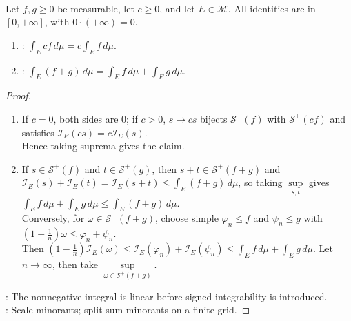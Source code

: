 \begin{proposition} \label{prop:nonnegative-integral-homogeneity-additivity} \\
Let $f,g\geq0$ be measurable, let $c\geq0$, and let $E\in\mathcal{M}$. All identities are in $[0,+\infty]$, with $0\cdot(+\infty)=0$.
\begin{enumerate}[label=(\roman*)]
\setlength{\itemsep}{0pt}
\item {}: $\int_E cf\,d\mu=c\int_E f\,d\mu$.
\item {}: $\int_E(f+g)\,d\mu=\int_Ef\,d\mu+\int_Eg\,d\mu$.
\end{enumerate}
\begin{proof}
\begin{enumerate}[label=(\roman*)]
\setlength{\itemsep}{0pt}
\item If $c=0$, both sides are $0$; if $c>0$, $s\mapsto cs$ bijects $\mathcal{S}^+(f)$ with $\mathcal{S}^+(cf)$ and satisfies $\mathcal{I}_E(cs)=c\mathcal{I}_E(s)$.\\
Hence taking suprema gives the claim.
\item If $s\in\mathcal{S}^+(f)$ and $t\in\mathcal{S}^+(g)$, then $s+t\in\mathcal{S}^+(f+g)$ and $\mathcal{I}_E(s)+\mathcal{I}_E(t)=\mathcal{I}_E(s+t)\leq\int_E(f+g)\,d\mu$, so taking $\sup\limits_{s,t}$ gives $\int_Ef\,d\mu+\int_Eg\,d\mu\leq\int_E(f+g)\,d\mu$.\\
Conversely, for $\omega\in\mathcal{S}^+(f+g)$, choose simple $\varphi_n\leq f$ and $\psi_n\leq g$ with $(1-\frac{1}{n})\omega\leq\varphi_n+\psi_n$.\\
Then $\left(1-\frac{1}{n}\right)\mathcal{I}_E(\omega)\leq\mathcal{I}_E(\varphi_n)+\mathcal{I}_E(\psi_n)\leq\int_E f\,d\mu+\int_E g\,d\mu$. Let $n\to\infty$, then take $\sup\limits_{\omega\in\mathcal{S}^+(f+g)}$.
\end{enumerate}
: The nonnegative integral is linear before signed integrability is introduced.\\
: Scale minorants; split sum-minorants on a finite grid.
\end{proof}
\end{proposition}

